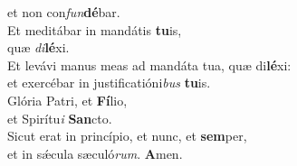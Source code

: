 \evenverse et non con\textit{fun}\textbf{dé}bar.\\
\oddverse Et meditábar in mandátis \textbf{tu}is,~\*\\
\oddverse quæ \textit{di}\textbf{lé}xi.\\
\evenverse Et levávi manus meas ad mandáta tua, quæ di\textbf{lé}xi:~\*\\
\evenverse et exercébar in justificatióni\textit{bus} \textbf{tu}is.\\
\oddverse Glória Patri, et \textbf{Fí}lio,~\*\\
\oddverse et Spirítu\textit{i} \textbf{San}cto.\\
\evenverse Sicut erat in princípio, et nunc, et \textbf{sem}per,~\*\\
\evenverse et in sǽcula sæculó\textit{rum}. \textbf{A}men.\\
